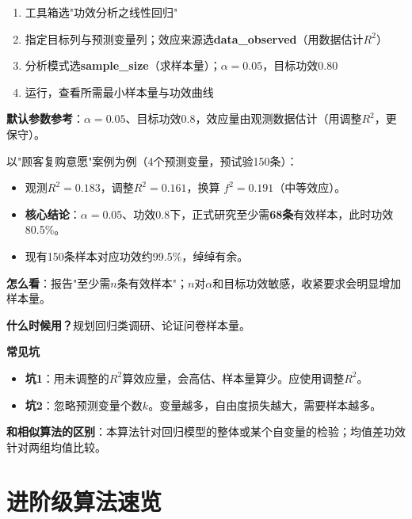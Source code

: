\begin{algosposs}
\begin{enumerate}
    \item 工具箱选"功效分析之线性回归"
    \item 指定目标列与预测变量列；效应来源选\textbf{data\_observed}（用数据估计$R^2$）
    \item 分析模式选\textbf{sample\_size}（求样本量）；$\alpha=0.05$，目标功效0.80
    \item 运行，查看所需最小样本量与功效曲线
\end{enumerate}

\textbf{默认参数参考}：$\alpha=0.05$、目标功效0.8，效应量由观测数据估计（用调整$R^2$，更保守）。
\end{algosposs}

\begin{algoresult}
以"顾客复购意愿"案例为例（4个预测变量，预试验150条）：

\begin{itemize}
    \item 观测$R^2=0.183$，调整$R^2=0.161$，换算 $f^2=0.191$（中等效应）。
    \item \textbf{核心结论}：$\alpha=0.05$、功效0.8下，正式研究至少需\textbf{68条}有效样本，此时功效80.5\%。
    \item 现有150条样本对应功效约99.5\%，绰绰有余。
\end{itemize}

\textbf{怎么看}：报告"至少需$n$条有效样本"；$n$对$\alpha$和目标功效敏感，收紧要求会明显增加样本量。
\end{algoresult}

\begin{algonotes}
\textbf{什么时候用？}规划回归类调研、论证问卷样本量。

\textbf{常见坑}
\begin{itemize}
    \item \textbf{坑1}：用未调整的$R^2$算效应量，会高估、样本量算少。应使用调整$R^2$。
    \item \textbf{坑2}：忽略预测变量个数$k$。变量越多，自由度损失越大，需要样本越多。
\end{itemize}

\textbf{和相似算法的区别}：本算法针对回归模型的整体或某个自变量的检验；均值差功效针对两组均值比较。
\end{algonotes}

\section{进阶级算法速览}

